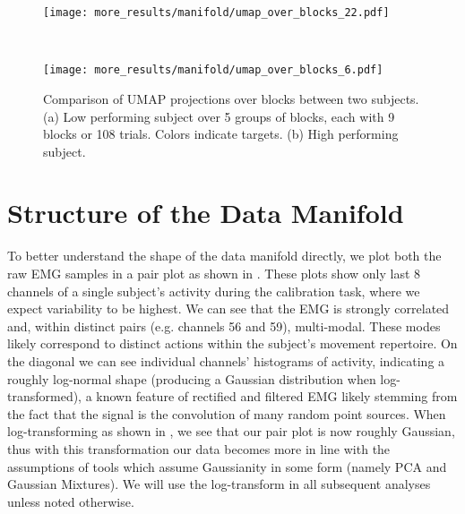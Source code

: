 \documentclass[../main.tex]{subfiles}
\begin{document}
\begin{figure}[!htb]
  \centering
  \begin{minipage}{\textwidth}
    \texttt{[image: more\_results/manifold/umap\_over\_blocks\_22.pdf]}
    \subcaption{}
  \end{minipage}\\%
  \begin{minipage}{\textwidth}
    \texttt{[image: more\_results/manifold/umap\_over\_blocks\_6.pdf]}
    \subcaption{}
  \end{minipage}
  \caption[Comparison of UMAP projections over blocks between two subjects]{Comparison of UMAP projections over blocks between two subjects. (a) Low performing subject over 5 groups of blocks, each with 9 blocks or 108 trials. Colors indicate targets. (b) High performing subject.}\label{fig:umap_over_blocks_comparison}
\end{figure}




\section{Structure of the Data Manifold}\label{sec:structure}

To better understand the shape of the data manifold directly, we plot both the raw EMG samples in a pair plot as shown in . These plots show only last 8 channels of a single subject's activity during the calibration task, where we expect variability to be highest. We can see that the EMG is strongly correlated and, within distinct pairs (e.g. channels 56 and 59), multi-modal. These modes likely correspond to distinct actions within the subject's movement repertoire. On the diagonal we can see individual channels' histograms of activity, indicating a roughly log-normal shape (producing a Gaussian distribution when log-transformed), a known feature of rectified and filtered EMG likely stemming from the fact that the signal is the convolution of many random point sources\cite{nazarpourNoteProbabilityDistribution2013a}. When log-transforming as shown in , we see that our pair plot is now roughly Gaussian, thus with this transformation our data becomes more in line with the assumptions of tools which assume Gaussianity in some form (namely PCA and Gaussian Mixtures). We will use the log-transform in all subsequent analyses unless noted otherwise.
\end{document}

